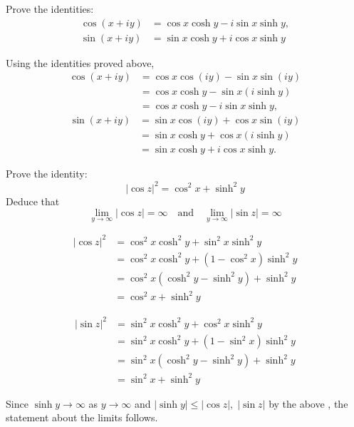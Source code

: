 \documentclass[12pt, answers]{exam}
\begin{document}
\begin{questions}
    \question
    Prove the identities:
    \begin{align*}
        \cos(x+iy) &= \cos x\cosh y - i\sin x\sinh y,\\
        \sin(x+iy) &= \sin x\cosh y + i\cos x\sinh y
    \end{align*}

    \begin{solution}
        Using the identities proved above,
        \begin{align*}
            \cos(x+iy) &= \cos x\cos(iy) - \sin x\sin(iy)\\
            &=\cos x\cosh y - \sin x(i\sinh y)\\
            &=\cos x\cosh y - i\sin x\sinh y,
        \end{align*}
        \begin{align*}
            \sin(x+iy) &= \sin x\cos(iy) + \cos x\sin(iy)\\
            &=\sin x\cosh y + \cos x(i\sinh y)\\
            &=\sin x\cosh y + i\cos x\sinh y.
        \end{align*}
    \end{solution}



    \question
    Prove the identity:
    \[
        |\cos z|^2 = \cos^2 x + \sinh^2 y
    \]
    Deduce that
    \[
        \lim_{y\to\infty} |\cos z| = \infty\quad\text{and}\quad
        \lim_{y\to\infty} |\sin z| = \infty
    \]
    \begin{solution}
        \begin{align*}
        |\cos z|^2 &= \cos^2 x\cosh^2 y + \sin^2 x\sinh^2 y\\
        &=  \cos^2 x\cosh^2 y + (1-\cos^2 x)\sinh^2 y\\
        &= \cos^2x(\cosh^2 y - \sinh^2 y) + \sinh^2 y\\
        &= \cos^2x + \sinh^2 y
    \end{align*}

    \begin{align*}
        |\sin z|^2 &= \sin^2 x\cosh^2 y + \cos^2 x\sinh^2 y\\
        &=  \sin^2 x\cosh^2 y + (1-\sin^2 x)\sinh^2 y\\
        &= \sin^2x(\cosh^2 y - \sinh^2 y) + \sinh^2 y\\
        &= \sin^2x + \sinh^2 y
    \end{align*}

    Since $\sinh y\to\infty$ as $y\to\infty$ and $|\sinh y|\leq |\cos z|,\;|\sin z|$ by the above ,
    the statement about the limits follows.
    \end{solution}




\end{questions}
\end{document}
